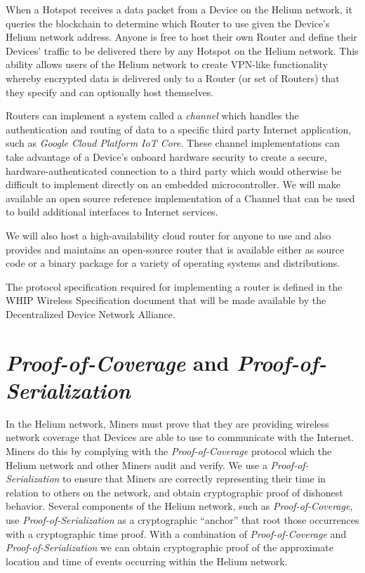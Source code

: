 \documentclass[10pt, nonatbib, nocopyrightspace, reprint]{sigplanconf}
\begin{document}
When a Hotspot receives a data packet from a Device on the Helium network, it queries the blockchain to determine which Router to use given the Device's Helium network address. Anyone is free to host their own Router and define their Devices' traffic to be delivered there by any Hotspot on the Helium network. This ability allows users of the Helium network to create VPN-like functionality whereby encrypted data is delivered only to a Router (or set of Routers) that they specify and can optionally host themselves.

Routers can implement a system called a \emph{channel} which handles the authentication and routing of data to a specific third party Internet application, such as \emph{Google Cloud Platform IoT Core}. These channel implementations can take advantage of a Device's onboard hardware security to create a secure, hardware-authenticated connection to a third party which would otherwise be difficult to implement directly on an embedded microcontroller. We will make available an open source reference implementation of a Channel that can be used to build additional interfaces to Internet services.

We will also host a high-availability cloud router for anyone to use and also provides and maintains an open-source router that is available either as source code or a binary package for a variety of operating systems and distributions.

The protocol specification required for implementing a router is defined in the WHIP Wireless Specification document that will be made available by the Decentralized Device Network Alliance.

\section{\emph{Proof-of-Coverage} and \emph{Proof-of-Serialization}}\label{poc}

In the Helium network, Miners must prove that they are providing wireless network coverage that Devices are able to use to communicate with the Internet. Miners do this by complying with the \emph{Proof-of-Coverage} protocol which the Helium network and other Miners audit and verify. We use a \emph{Proof-of-Serialization} to ensure that Miners are correctly representing their time in relation to others on the network, and obtain cryptographic proof of dishonest behavior. Several components of the Helium network, such as \emph{Proof-of-Coverage}, use \emph{Proof-of-Serialization} as a cryptographic ``anchor'' that root those occurrences  with a cryptographic time proof. With a combination of \emph{Proof-of-Coverage} and \emph{Proof-of-Serialization} we can obtain cryptographic proof of the approximate location and time of events occurring within the Helium network.
\end{document}
